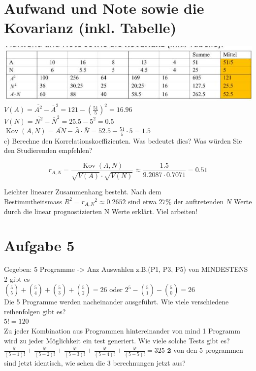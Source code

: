 \documentclass[10pt]{article}
\begin{document}
{\section*{Aufwand und Note sowie die Kovarianz (inkl. Tabelle)}
\includegraphics[max width=\textwidth, center]{2024_12_29_0906b02acf849bda8665g-5(7)}\\
$V(A)=\overline{A^{2}}-\bar{A}^{2}=121-\left(\frac{51}{5}\right)^{2}=16.96$\\
$V(N)=\overline{N^{2}}-\bar{N}^{2}=25.5-5^{2}=0.5$\\
$\operatorname{Kov}(A, N)=\overline{A N}-\bar{A} \cdot \bar{N}=52.5-\frac{51}{5} \cdot 5=1.5$\\
c) Berechne den Korrelationskoeffizienten. Was bedeutet dies? Was würden Sie den Studierenden empfehlen?

$$
r_{A, N}=\frac{\operatorname{Kov}(A, N)}{\sqrt{V(A)} \cdot \sqrt{V(N)}} \approx \frac{1.5}{9.2087 \cdot 0.7071}=0.51
$$

Leichter linearer Zusammenhang besteht. Nach dem\\
Bestimmtheitsmass $R^{2}=r_{A, N}{ }^{2} \approx 0.2652$ sind etwa $27 \%$ der auftretenden $N$ Werte durch die linear prognostizierten N Werte erklärt. Viel arbeiten!

\section*{Aufgabe 5}
Gegeben: 5 Programme -> Anz Auswahlen z.B.(P1, P3, P5) von MINDESTENS 2 gibt es\\
$\binom{5}{5}+\binom{5}{4}+\binom{5}{3}+\binom{5}{2}=26$ oder $2^{5}-\binom{5}{1}-\binom{5}{0}=26$\\
Die 5 Programme werden nacheinander ausgeführt. Wie viele verschiedene reihenfolgen gibt es?\\
$5!=120$\\
Zu jeder Kombination aus Programmen hintereinander von mind 1 Programm wird zu jeder Möglichkeit ein test generiert. Wie viele solche Tests gibt es?\\
$\frac{5!}{(5-1)!}+\frac{5!}{(5-2)!}+\frac{5!}{(5-3)!}+\frac{5!}{(5-4)!}+\frac{5!}{(5-5)!}=325$ $\mathbf{2}$ von den 5 programmen sind jetzt identisch, wie sehen die 3 berechnungen jetzt aus?

}
\end{document}
